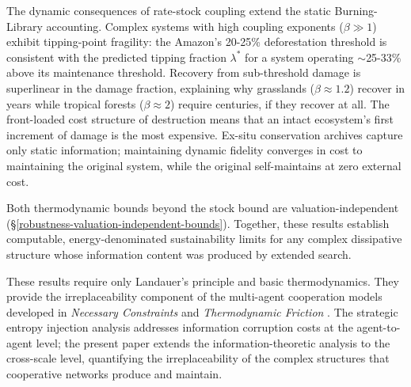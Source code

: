 \documentclass[11pt]{article}
\theoremstyle{plain}
\theoremstyle{definition}
\theoremstyle{remark}
\begin{document}
The dynamic consequences of rate-stock coupling extend the static
Burning-Library accounting. Complex systems with high coupling exponents
(\(\beta \gg 1\)) exhibit tipping-point fragility: the Amazon's 20-25\%
deforestation threshold \citep{LovejoyNobre2018} is consistent with the
predicted tipping fraction \(\lambda^*\) for a system operating
$\sim$25-33\% above its maintenance threshold. Recovery from
sub-threshold damage is superlinear in the damage fraction, explaining
why grasslands (\(\beta \approx 1.2\)) recover in years while tropical
forests (\(\beta \approx 2\)) require centuries, if they recover at all.
The front-loaded cost structure of destruction means that an intact
ecosystem's first increment of damage is the most expensive. Ex-situ
conservation archives capture only static information; maintaining
dynamic fidelity converges in cost to maintaining the original system,
while the original self-maintains at zero external cost.

Both thermodynamic bounds beyond the stock bound are
valuation-independent (§\ref{robustness-valuation-independent-bounds}).
Together, these results establish computable, energy-denominated
sustainability limits for any complex dissipative structure whose
information content was produced by extended search.

These results require only Landauer's principle and basic
thermodynamics. They provide the irreplaceability component of the
multi-agent cooperation models developed in \emph{Necessary Constraints}
\citep{TC-I} and \emph{Thermodynamic Friction} \citep{TC-IV}. The
strategic entropy injection analysis \citep{TC-II} addresses information
corruption costs at the agent-to-agent level; the present paper extends
the information-theoretic analysis to the cross-scale level, quantifying
the irreplaceability of the complex structures that cooperative networks
produce and maintain.
\end{document}
